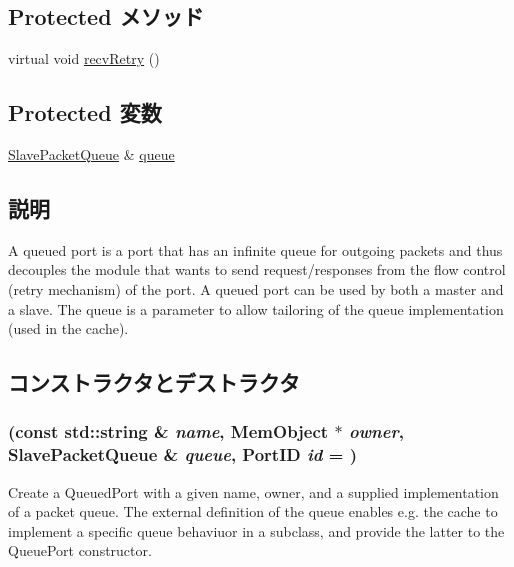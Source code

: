 \subsection*{Protected メソッド}
\begin{DoxyCompactItemize}
\item 
virtual void \hyperlink{classQueuedSlavePort_a7ec461ad187b82b4b21e27c86e45cf9c}{recvRetry} ()
\end{DoxyCompactItemize}
\subsection*{Protected 変数}
\begin{DoxyCompactItemize}
\item 
\hyperlink{classSlavePacketQueue}{SlavePacketQueue} \& \hyperlink{classQueuedSlavePort_a89fcdbe2ab63d24f2112bc7e05bf2413}{queue}
\end{DoxyCompactItemize}


\subsection{説明}
A queued port is a port that has an infinite queue for outgoing packets and thus decouples the module that wants to send request/responses from the flow control (retry mechanism) of the port. A queued port can be used by both a master and a slave. The queue is a parameter to allow tailoring of the queue implementation (used in the cache). 

\subsection{コンストラクタとデストラクタ}
\hypertarget{classQueuedSlavePort_a150e71ad6ae4ad6eb65adc52ca8ff294}{
\subsubsection[{QueuedSlavePort}]{ (const std::string \& {\em name}, \/  {\bf MemObject} $\ast$ {\em owner}, \/  {\bf SlavePacketQueue} \& {\em queue}, \/  {\bf PortID} {\em id} = {})}}
\label{classQueuedSlavePort_a150e71ad6ae4ad6eb65adc52ca8ff294}
Create a QueuedPort with a given name, owner, and a supplied implementation of a packet queue. The external definition of the queue enables e.g. the cache to implement a specific queue behaviuor in a subclass, and provide the latter to the QueuePort constructor. 



